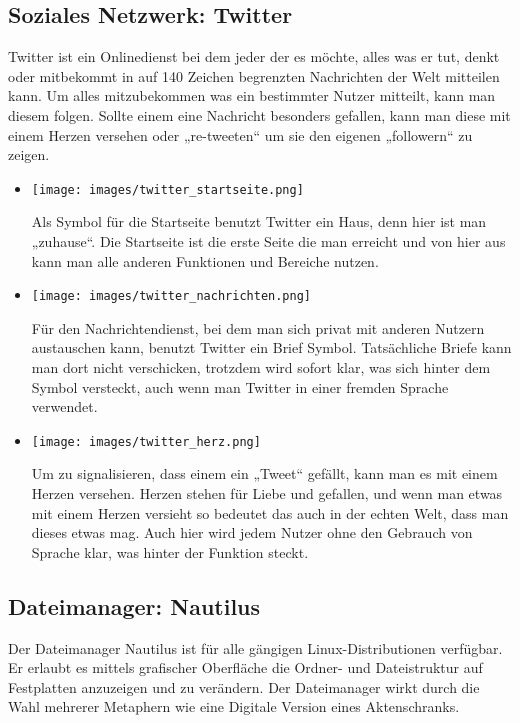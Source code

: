 \documentclass[a4paper,10pt]{article}
\begin{document}
\subsection{Soziales Netzwerk: Twitter}
Twitter ist ein Onlinedienst bei dem jeder der es möchte, alles was er tut, denkt oder mitbekommt in auf 140 Zeichen begrenzten Nachrichten der Welt mitteilen kann. Um alles mitzubekommen was ein bestimmter Nutzer mitteilt, kann man diesem folgen. Sollte einem eine Nachricht besonders gefallen, kann man diese mit einem Herzen versehen oder „re-tweeten“ um sie den eigenen „followern“ zu zeigen.

\begin{itemize}
\item
\texttt{[image: images/twitter\_startseite.png]}

Als Symbol für die Startseite benutzt Twitter ein Haus, denn hier ist man „zuhause“. Die Startseite ist die erste Seite die man erreicht und von hier aus kann man alle anderen Funktionen und Bereiche nutzen.

\item
\texttt{[image: images/twitter\_nachrichten.png]}

Für den Nachrichtendienst, bei dem man sich privat mit anderen Nutzern austauschen kann, benutzt Twitter ein Brief Symbol. Tatsächliche Briefe kann man dort nicht verschicken, trotzdem wird sofort klar, was sich hinter dem Symbol versteckt, auch wenn man Twitter in einer fremden Sprache verwendet.

\item 
\texttt{[image: images/twitter\_herz.png]}

Um zu signalisieren, dass einem ein „Tweet“ gefällt, kann man es mit einem Herzen versehen. Herzen stehen für Liebe und gefallen, und wenn man etwas mit einem Herzen versieht so bedeutet das auch in der echten Welt, dass man dieses etwas mag. Auch hier wird jedem Nutzer ohne den Gebrauch von Sprache klar, was hinter der Funktion steckt.
\end{itemize}


\subsection{Dateimanager: Nautilus}
Der Dateimanager Nautilus ist für alle gängigen Linux-Distributionen verfügbar. Er erlaubt es mittels grafischer Oberfläche die Ordner- und Dateistruktur auf Festplatten anzuzeigen und zu verändern. Der Dateimanager wirkt durch die Wahl mehrerer Metaphern wie eine Digitale Version eines Aktenschranks.
\end{document}

